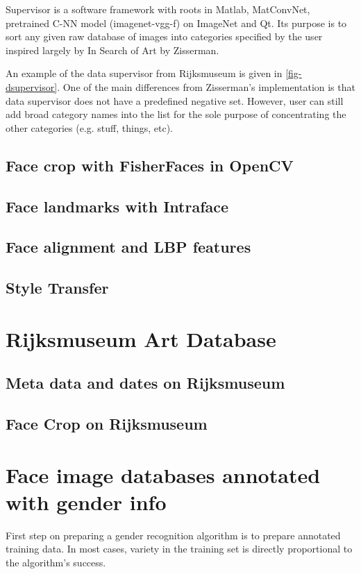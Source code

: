 \documentclass[runningheads]{llncs}
\begin{document}
Supervisor is a software framework with roots in Matlab\cite{MATLAB:2014}, MatConvNet\cite{matconvnet}, pretrained C-NN model\cite{Chatfield14} (imagenet-vgg-f) on ImageNet\cite{ILSVRC15} and Qt. Its purpose is to sort any given raw database of images into categories specified by the user inspired largely by In Search of Art by Zisserman\cite{Crowley14a}.

An example of the data supervisor from Rijksmuseum\cite{rijksmuseum1976tot} is given in \ref{fig-dsupervisor}. One of the main differences from Zisserman's\cite{Crowley14a} implementation is that data supervisor does not have a predefined negative set. However, user can still add broad category names into the list for the sole purpose of concentrating the other categories (e.g. stuff, things, etc).


\subsection{Face crop with FisherFaces in OpenCV}

\subsection{Face landmarks with Intraface}

\subsection{Face alignment and LBP features}

\subsection{Style Transfer}

\section{Rijksmuseum Art Database}
\subsection{Meta data and dates on Rijksmuseum}

\subsection{Face Crop on Rijksmuseum}

\section{Face image databases annotated with gender info}
First step on preparing a gender recognition algorithm is to prepare annotated training data. In most cases, variety in the training set is directly proportional to the algorithm's success. 
\end{document}
